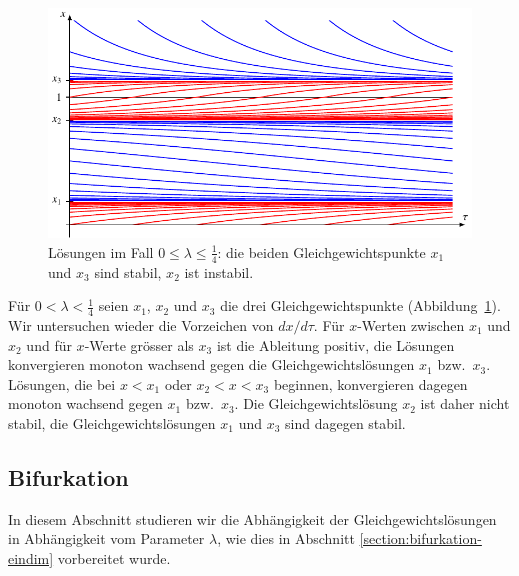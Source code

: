 \begin{figure}
\centering
\includegraphics{chapters/4/drei.pdf}
\caption{Lösungen im Fall $0\le \lambda\le\frac14$: die beiden
Gleichgewichtspunkte $x_1$ und $x_3$ sind stabil, $x_2$ ist instabil.
\label{skript:thc:drei}}
\end{figure}%
Für $0<\lambda<\frac14$ seien
$x_1$, $x_2$ und $x_3$ die drei Gleichgewichtspunkte
(Abbildung~\ref{skript:thc:drei}).
Wir untersuchen wieder die Vorzeichen von $dx/d\tau$. 
Für $x$-Werten zwischen $x_1$ und $x_2$ und für $x$-Werte grösser
als $x_3$ ist die Ableitung positiv, die Lösungen konvergieren monoton
wachsend gegen die Gleichgewichtslösungen $x_1$ bzw.~$x_3$.
Lösungen, die bei $x<x_1$ oder $x_2<x<x_3$ beginnen, konvergieren
dagegen monoton wachsend gegen $x_1$ bzw.~$x_3$.
Die Gleichgewichtslösung $x_2$ ist daher nicht stabil,
die Gleichgewichtslösungen $x_1$ und $x_3$ sind dagegen stabil.

\subsection{Bifurkation}
In diesem Abschnitt studieren wir die Abhängigkeit der Gleichgewichtslösungen
in Abhängigkeit vom Parameter $\lambda$, wie dies in Abschnitt
\ref{section:bifurkation-eindim} vorbereitet wurde.

